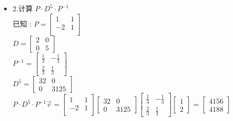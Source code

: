 \documentclass[12pt]{article}
\begin{document}
\begin{flushleft}
\begin{itemize}
        \item 2.计算 $P\cdot D^{5} \cdot P^{-1}$ \\
              已知 : $P = \begin{bmatrix}
                      1  & 1 \\
                      -2 & 1 \\
                  \end{bmatrix}$ \\
              $D = \begin{bmatrix}
                      2 & 0 \\
                      0 & 5
                  \end{bmatrix}$ \\
              $P^{-1} = \begin{bmatrix}
                      \frac{1}{3} & -\frac{1}{3} \\
                      \frac{2}{3} & \frac{1}{3}
                  \end{bmatrix}$ \\
              $D^{5}  = \begin{bmatrix}
                      32 & 0    \\
                      0  & 3125
                  \end{bmatrix}$ \\
              $P\cdot D^{5} \cdot P^{-1} \vec{v}$ = $
                  \begin{bmatrix}
                      1  & 1 \\
                      -2 & 1 \\
                  \end{bmatrix}\begin{bmatrix}
                      32 & 0    \\
                      0  & 3125
                  \end{bmatrix}\begin{bmatrix}
                      \frac{1}{3} & -\frac{1}{3} \\
                      \frac{2}{3} & \frac{1}{3}
                  \end{bmatrix}\begin{bmatrix}
                      1 \\
                      2
                  \end{bmatrix}$
              =  $\begin{bmatrix}
                      4156 \\
                      4188
                  \end{bmatrix}$ \\


\end{itemize}
\end{flushleft}
\end{document}

